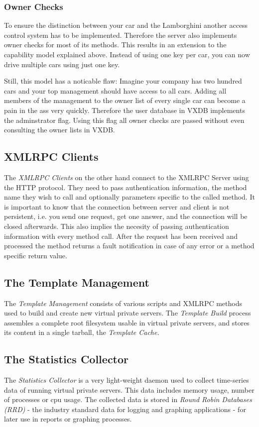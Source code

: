 \subsubsection{Owner Checks}

To ensure the distinction between your car and the Lamborghini another access
control system has to be implemented. Therefore the server also implements
owner checks for most of its methods. This results in an extension to the
capability model explained above. Instead of using one key per car, you can now
drive multiple cars using just one key.

Still, this model has a noticable flaw: Imagine your company has two hundred
cars and your top management should have access to all cars. Adding all members
of the management to the owner list of every single car can become a pain in
the ass very quickly. Therefore the user database in VXDB implements the
adminstrator flag. Using this flag all owner checks are passed without even
consulting the owner lists in VXDB.


\subsection{XMLRPC Clients}

The \emph{XMLRPC Clients} on the other hand connect to the XMLRPC Server using
the HTTP protocol. They need to pass authentication information, the method
name they wish to call and optionally parameters specific to the called method.
It is important to know that the connection between server and client is not
persistent, i.e. you send one request, get one answer, and the connection will
be closed afterwards. This also implies the necesity of passing authentication
information with every method call. After the request has been received and
processed the method returns a fault notification in case of any error or a
method specific return value.


\subsection{The Template Management}

The \emph{Template Management} consists of various scripts and XMLRPC methods
used to build and create new virtual private servers. The \emph{Template Build}
process assembles a complete root filesystem usable in virtual private servers,
and stores its content in a single tarball, the \emph{Template Cache.}


\subsection{The Statistics Collector}

The \emph{Statistics Collector} is a very light-weight daemon used to collect
time-series data of running virtual private servers. This data includes memory
usage, number of processes or cpu usage. The collected data is stored in
\emph{Round Robin Databases (RRD)} - the industry standard data for logging and
graphing applications - for later use in reports or graphing processes. 

